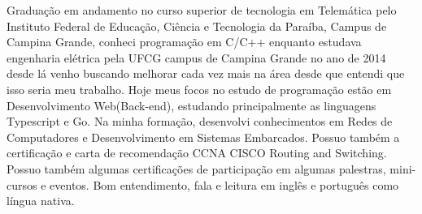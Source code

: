 \begin{cvletter}
  Graduação em andamento no curso superior de tecnologia em Telemática pelo Instituto Federal de Educação, Ciência e Tecnologia da Paraíba, Campus de Campina Grande, conheci programação em C/C++ enquanto estudava engenharia elétrica pela UFCG campus de Campina Grande no ano de 2014 desde lá venho buscando melhorar cada vez mais na área desde que entendi que isso seria meu trabalho. Hoje meus focos no estudo de programação estão em Desenvolvimento Web(Back-end), estudando principalmente as linguagens Typescript e Go. Na minha formação, desenvolvi conhecimentos em Redes de Computadores e Desenvolvimento em Sistemas Embarcados. Possuo também a certificação e carta de recomendação CCNA CISCO Routing and Switching. Possuo também algumas certificações de participação em algumas palestras, mini-cursos e eventos. Bom entendimento, fala e leitura em inglês e português como língua nativa.

\end{cvletter}